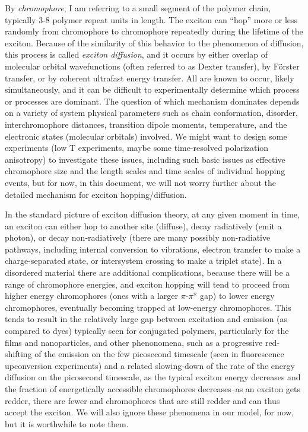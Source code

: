 \documentclass[12pt]{article}
\begin{document}
By {\em chromophore}, I am referring to a small segment of the polymer
chain, typically 3-8 polymer repeat units in length.  The exciton can
``hop'' more or less randomly from chromophore to chromophore
repeatedly during the lifetime of the exciton.  Because of the
similarity of this behavior to the phenomenon of diffusion, this
process is called {\em exciton diffusion}, and it occurs by either
overlap of molecular orbital wavefunctions (often referred to as
Dexter transfer), by F\" orster transfer, or by coherent ultrafast
energy transfer.  All are known to occur, likely simultaneously, and
it can be difficult to experimentally determine which process or
processes are dominant. The question of which mechanism dominates
depends on a variety of system physical parameters such as chain
conformation, disorder, interchromophore distances, transition dipole
moments, temperature, and the electronic states (molecular orbitals)
involved.  We might want to design some experiments (low T
experiments, maybe some time-resolved polarization anisotropy) to
investigate these issues, including such basic issues as effective
chromophore size and the length scales and time scales of individual
hopping events, but for now, in this document, we will not worry
further about the detailed mechanism for exciton hopping/diffusion.

In the standard picture of exciton diffusion theory, at any given
moment in time, an exciton can either hop to another site (diffuse),
decay radiatively (emit a photon), or decay non-radiatively (there are
many possibly non-radiative pathways, including internal conversion to
vibrations, electron transfer to make a charge-separated state, or
intersystem crossing to make a triplet state).  In a disordered
material there are additional complications, because there will be a
range of chromophore energies, and exciton hopping will tend to
proceed from higher energy chromophores (ones with a larger
$\pi$-$\pi$* gap) to lower energy chromophores, eventually becoming
trapped at low-energy chromophores.  This tends to result in the
relatively large gap between excitation and emission (as compared to
dyes) typically seen for conjugated polymers, particularly for the
films and nanoparticles, and other phenonomena, such as a progressive
red-shifting of the emission on the few picosecond timescale (seen in
fluorescence upconversion experiments) and a related slowing-down of
the rate of the energy diffusion on the picosecond timescale, as the
typical exciton energy decreases and the fraction of energetically
accessible chromophores decreases--as an exciton gets redder, there
are fewer and chromophores that are still redder and can thus accept
the exciton. We will also ignore these phenomena in our model, for
now, but it is worthwhile to note them.
\end{document}
